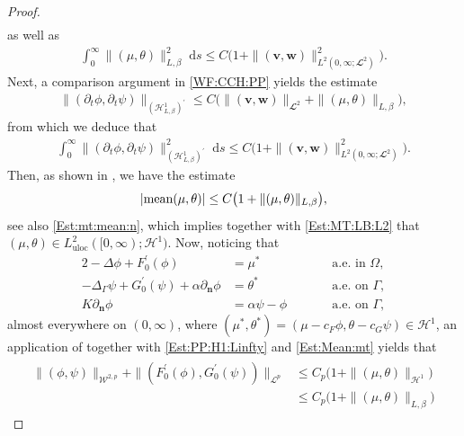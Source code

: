 \documentclass[10pt,reqno]{amsart}
\theoremstyle{remark}
\numberwithin{equation}{section}
\newcommand{\abs}[1]{| #1 |}
\newcommand{\norm}[1]{\| #1 \|}
\newcommand{\scp}[2]{ ( #1 , #2  )}
\newcommand{\mean}[2]{\textnormal{mean}\scp{#1}{#2}}
\newcommand{\n}{\mathbf{n}}
\newcommand{\bv}{\mathbf{v}}
\newcommand{\bw}{\mathbf{w}}
\newcommand{\ds}{\;\mathrm ds}
\newcommand{\delt}{\partial_{t}}
\newcommand{\deln}{\partial_\n}
\newcommand{\Lap}{\Delta}
\newcommand{\Lapg}{\Delta_\Ga}
\newcommand{\Om}{\Omega}
\newcommand{\Ga}{\Gamma}
\begin{document}
\begin{proof}
\begin{align}
    \end{align}
    as well as
    \begin{align}\label{Est:MT:LB:L2}
        \int_0^\infty \norm{(\mu,\theta)}_{L,\beta}^2\ds \leq C\big(1 + \norm{(\bv,\bw)}_{L^2(0,\infty;\mathbfcal{L}^2)}^2\big).
    \end{align}
    Next, a comparison argument in \eqref{WF:CCH:PP} yields the estimate
    \begin{align}\label{Est:DELT:PP:H1Lb':a.e.}
        \norm{(\delt\phi,\delt\psi)}_{(\mathcal{H}^1_{L,\beta})^\prime} \leq C\big(\norm{(\bv,\bw)}_{\mathbfcal{L}^2} + \norm{(\mu,\theta)}_{L,\beta}\big),
    \end{align}
    from which we deduce that
    \begin{align}\label{EST:DELT:PP:H1Lb':L2}
        \int_0^\infty \norm{(\delt\phi,\delt\psi)}_{(\mathcal{H}^1_{L,\beta})^\prime}^2\ds \leq C\big(1 + \norm{(\bv,\bw)}_{L^2(0,\infty;\mathbfcal{L}^2)}^2\big).
    \end{align}
    Then, as shown in \cite{Knopf2025}, we have the estimate
    \begin{align}\label{Est:Mean:mt}
        \abs{\mean{\mu}{\theta}} \leq C\big(1 + \norm{(\mu,\theta)}_{L,\beta}\big),
    \end{align}
    see also \eqref{Est:mt:mean:n}, which implies together with \eqref{Est:MT:LB:L2} that $(\mu,\theta)\in L^2_{\mathrm{uloc}}([0,\infty);\mathcal{H}^1)$. Now, noticing that
    \begin{alignat*}{2}
        -\Lap\phi + F_0^\prime(\phi) &= \mu^\ast &&\qquad\text{a.e.~in~}\Om, \\
        -\Lapg\psi + G_0^\prime(\psi) + \alpha\deln\phi &= \theta^\ast &&\qquad\text{a.e.~on~}\Ga, \\
        K\deln\phi &= \alpha\psi - \phi &&\qquad\text{a.e.~on~}\Ga,
    \end{alignat*}
    almost everywhere on $(0,\infty)$, where $(\mu^\ast, \theta^\ast) = (\mu - c_F\phi, \theta - c_G\psi)\in\mathcal{H}^1$, an application of \cite[Proposition~6.5]{Giorgini2025} together with \eqref{Est:PP:H1:Linfty} and \eqref{Est:Mean:mt} yields that
    \begin{align}\label{Est:pp:Pot:Lp:a.e.}
        \begin{split}
            \norm{(\phi,\psi)}_{\mathcal{W}^{2,p}} + \norm{(F_0^\prime(\phi),G_0^\prime(\psi))}_{\mathcal{L}^p} &\leq C_p\big(1 + \norm{(\mu,\theta)}_{\mathcal{H}^1}\big) \\
            &\leq C_p(1 + \norm{(\mu,\theta)}_{L,\beta}\big)

\end{split}
\end{align}
\end{proof}
\end{document}
